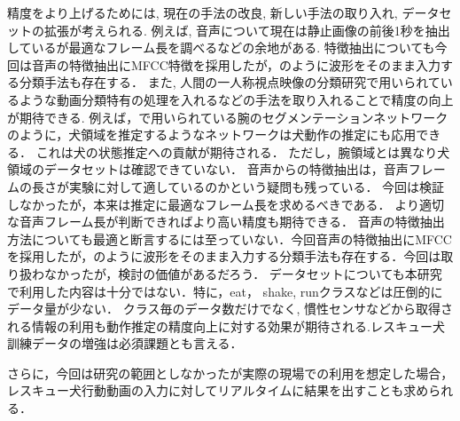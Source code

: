 \documentclass[MIRU,submit]{miru2019j}
\begin{document}
精度をより上げるためには, 現在の手法の改良, 新しい手法の取り入れ, データセットの拡張が考えられる.
例えば, 音声について現在は静止画像の前後1秒を抽出しているが最適なフレーム長を調べるなどの余地がある.
特徴抽出についても今回は音声の特徴抽出にMFCC特徴を採用したが，\cite{aytar2016soundnet}のように波形をそのまま入力する分類手法も存在する．
また, 人間の一人称視点映像の分類研究で用いられているような動画分類特有の処理を入れるなどの手法を取り入れることで精度の向上が期待できる.
例えば，\cite{minghuang2016fpar}で用いられている腕のセグメンテーションネットワークのように，犬領域を推定するようなネットワークは犬動作の推定にも応用できる．
これは犬の状態推定への貢献が期待される．
ただし，腕領域とは異なり犬領域のデータセットは確認できていない．
音声からの特徴抽出は，音声フレームの長さが実験に対して適しているのかという疑問も残っている．
今回は検証しなかったが，本来は推定に最適なフレーム長を求めるべきである．
より適切な音声フレーム長が判断できればより高い精度も期待できる．
音声の特徴抽出方法についても最適と断言するには至っていない．今回音声の特徴抽出にMFCCを採用したが，\cite{aytar2016soundnet}のように波形をそのまま入力する分類手法も存在する．今回は取り扱わなかったが，検討の価値があるだろう．
データセットについても本研究で利用した内容は十分ではない．特に，eat， shake, runクラスなどは圧倒的にデータ量が少ない．
クラス毎のデータ数だけでなく, 慣性センサなどから取得される情報の利用も動作推定の精度向上に対する効果が期待される.レスキュー犬訓練データの増強は必須課題とも言える．

さらに，今回は研究の範囲としなかったが実際の現場での利用を想定した場合，レスキュー犬行動動画の入力に対してリアルタイムに結果を出すことも求められる．




\end{document}
